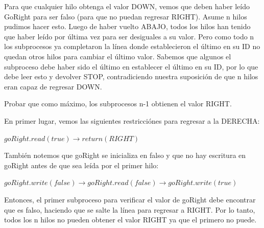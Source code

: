 \documentclass[12pt, letterpaper]{article}
\begin{document}
\begin{itemize}
Para que cualquier hilo obtenga el valor DOWN, vemos que deben haber leído
GoRight para ser falso (para que no puedan regresar RIGHT). Asume n hilos
pudimos hacer esto. Luego de haber vuelto ABAJO, todos los hilos
han tenido que haber leído por última vez para ser desiguales a su valor. Pero como todo n
los subprocesos ya completaron la línea donde establecieron el último en su ID
no quedan otros hilos para cambiar el último valor. Sabemos que algunos
el subproceso debe haber sido el último en establecer el último en su ID, por lo que debe leer
esto y devolver STOP, contradiciendo nuestra suposición de que n hilos eran
capaz de regresar DOWN.



Probar que como máximo, los subprocesos n-1 obtienen el valor RIGHT.

En primer lugar, vemos las siguientes restricci\'ones para regresar a la DERECHA:


\begin{center}
$goRight.read(true) \rightarrow return(RIGHT)$
\end{center}

También notemos que goRight se inicializa en falso y que no hay escritura en goRight antes de que sea le\'ida por el primer hilo:

\begin{center}
$goRight.write(f alse) \rightarrow goRight.read(f alse) \rightarrow goRight.write(true)$
\end{center}
Entonces, el primer subproceso para verificar el valor de goRight debe encontrar que es falso,
haciendo que se salte la l\'inea para regresar a RIGHT. Por lo tanto, todos los n hilos no pueden
obtener el valor RIGHT ya que el primero no puede.


\end{itemize}
\end{document}
